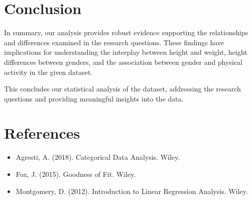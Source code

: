 \documentclass[
]{article}
\begin{document}
\hypertarget{conclusion}{%
\section{Conclusion}\label{conclusion}}

In summary, our analysis provides robust evidence supporting the relationships and differences examined in the research questions. These findings have implications for understanding the interplay between height and weight, height differences between genders, and the association between gender and physical activity in the given dataset.

This concludes our statistical analysis of the dataset, addressing the research questions and providing meaningful insights into the data.

\hypertarget{references}{%
\section{References}\label{references}}

\begin{itemize}
\item
  Agresti, A. (2018). Categorical Data Analysis. Wiley.
\item
  Fox, J. (2015). Goodness of Fit. Wiley.
\item
  Montgomery, D. (2012). Introduction to Linear Regression Analysis. Wiley.
\end{itemize}
\end{document}
